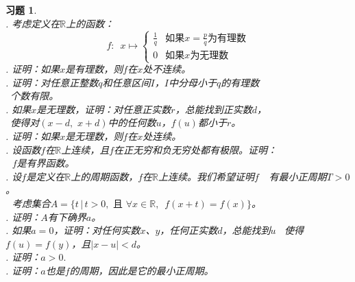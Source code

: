 \documentclass[12pt,UTF8]{ctexbook}
\newtheorem{xt}{习题}[section]
\begin{document}
\begin{appendix}
\begin{xt}
    \mbox{} \\
    . 考虑定义在$\mathbb{R}$上的函数：
    $$ f: \,\,\, x\mapsto \left\{
    \begin{array}{cl}
        \frac{1}{q} & \mbox{如果}x = \frac{p}{q}\mbox{为有理数} \\
        0           & \mbox{如果}x\mbox{为无理数} 
    \end{array}\right.
    $$
    . 证明：如果$x$是有理数，则$f$在$x$处不连续。\\
    . 证明：对任意正整数$q$和任意区间$I$，$I$中分母小于$q$的有理数\\
    \indent\quad\;\;\, 个数有限。\\
    . 如果$x$是无理数，证明：对任意正实数$r$，总能找到正实数$d$，\\
    \indent\quad\;\;\, 使得对$(x - d,\,\, x + d)$中的任何数$u$，$f(u)$都小于$r$。\\
    . 证明：如果$x$是无理数，则$f$在$x$处连续。\\
    . 设函数$f$在$\mathbb{R}$上连续，且$f$在正无穷和负无穷处都有极限。证明：\\
    \indent\;\;\,\, $f$是有界函数。\\
    . 设$f$是定义在$\mathbb{R}$上的周期函数，$f$在$\mathbb{R}$上连续。我们希望证明$f$
    \indent\;\;\,\, 有最小正周期$T>0$。\\
    \indent\;\;\,\, 考虑集合$A = \{t \, | \, t > 0,\,\, \mbox{且}\,\,\forall x\in\mathbb{R},\,\,\, f(x+t) = f(x)\}$。\\
    . 证明：$A$有下确界$a$。\\
    . 如果$a = 0$，证明：对任何实数$x$、$y$，任何正实数$d$，总能找到$u$
    \indent\quad\;\;\, 使得$f(u) = f(y)$，且$|x - u| < d$。\\
    . 证明：$a > 0.$\\
    . 证明：$a$也是$f$的周期，因此是它的最小正周期。
\end{xt}

\end{appendix}
\end{document}
